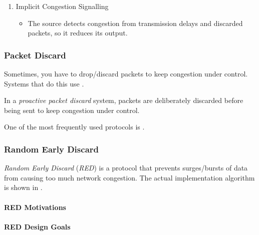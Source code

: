 \begin{definition}
\begin{enumerate}[noitemsep]
\item Implicit Congestion Signalling
  \begin{itemize}[noitemsep]
  \item The source detects congestion from transmission delays and discarded packets, so it reduces its output.
  \end{itemize}
\end{enumerate}

\subsubsection{Packet Discard}\label{subsubsec:Packet_Discard}
Sometimes, you have to drop/discard packets to keep congestion under control.
Systems that do this use .

\begin{definition}\label{def:Proactive_Packet_Discard}
  In a \emph{proactive packet discard} system, packets are deliberately discarded before being sent to keep congestion under control.
\end{definition}

One of the most frequently used protocols is .

\subsubsection{Random Early Discard}\label{subsubsec:Random_Early_Discard}
\begin{definition}\label{def:Random_Early_Discard}
  \emph{Random Early Discard} (\emph{RED}) is a protocol that prevents surges/bursts of data from causing too much network congestion.
  The actual implementation algorithm is shown in .
\end{definition}

\paragraph{RED Motivations}\label{par:Random_Early_Discard_Motivations}
\paragraph{RED Design Goals}\label{par:Random_Early_Discard_Design_Goals}

\end{definition}
